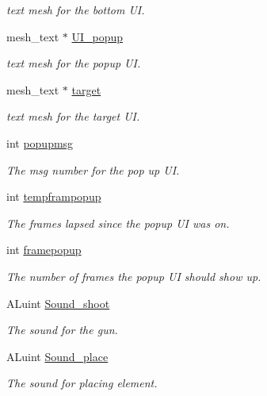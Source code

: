 \begin{DoxyCompactItemize}
\begin{DoxyCompactList}\small\item\em text mesh for the bottom U\+I. \end{DoxyCompactList}\item 
mesh\+\_\+text $\ast$ \hyperlink{classoctet_1_1minecraft__wars_a3afa44a220796b1132b02c6ceb405fb1}{U\+I\+\_\+popup}
\begin{DoxyCompactList}\small\item\em text mesh for the popup U\+I. \end{DoxyCompactList}\item 
mesh\+\_\+text $\ast$ \hyperlink{classoctet_1_1minecraft__wars_a42fe53052b940a1b7f758e56156bbc3c}{target}
\begin{DoxyCompactList}\small\item\em text mesh for the target U\+I. \end{DoxyCompactList}\item 
int \hyperlink{classoctet_1_1minecraft__wars_aff5e77fadc9292cc353969851ee6e5ac}{popupmsg}
\begin{DoxyCompactList}\small\item\em The msg number for the pop up U\+I. \end{DoxyCompactList}\item 
int \hyperlink{classoctet_1_1minecraft__wars_af4669b717235fe938e43d8a6073ec3a9}{tempframpopup}
\begin{DoxyCompactList}\small\item\em The frames lapsed since the popup U\+I was on. \end{DoxyCompactList}\item 
int \hyperlink{classoctet_1_1minecraft__wars_ac65c7178370f1749467b5572bada9b36}{framepopup}
\begin{DoxyCompactList}\small\item\em The number of frames the popup U\+I should show up. \end{DoxyCompactList}\item 
A\+Luint \hyperlink{classoctet_1_1minecraft__wars_a8a76b75425f33dfe9a3895d5c1557e82}{Sound\+\_\+shoot}
\begin{DoxyCompactList}\small\item\em The sound for the gun. \end{DoxyCompactList}\item 
A\+Luint \hyperlink{classoctet_1_1minecraft__wars_a49c6d9bfd8211e8627e609be0be42f77}{Sound\+\_\+place}
\begin{DoxyCompactList}\small\item\em The sound for placing element. \end{DoxyCompactList}\item 

\end{DoxyCompactItemize}
